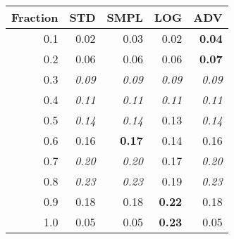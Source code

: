 \documentclass{standalone}
\begin{document}
\begin{tabular}{r|rrrr}
      \toprule
      Fraction & STD & SMPL & LOG & ADV\\
      \midrule
      0.1 & 0.02 & 0.03 & 0.02 & \textbf{0.04}\\
  0.2 & 0.06 & 0.06 & 0.06 & \textbf{0.07}\\
  0.3 & \emph{0.09} & \emph{0.09} & \emph{0.09} & \emph{0.09}\\
  0.4 & \emph{0.11} & \emph{0.11} & \emph{0.11} & \emph{0.11}\\
  0.5 & \emph{0.14} & \emph{0.14} & 0.13 & \emph{0.14}\\
  0.6 & 0.16 & \textbf{0.17} & 0.14 & 0.16\\
  0.7 & \emph{0.20} & \emph{0.20} & 0.17 & \emph{0.20}\\
  0.8 & \emph{0.23} & \emph{0.23} & 0.19 & \emph{0.23}\\
  0.9 & 0.18 & 0.18 & \textbf{0.22} & 0.18\\
  1.0 & 0.05 & 0.05 & \textbf{0.23} & 0.05\\
  \bottomrule
\end{tabular}
\end{document}
